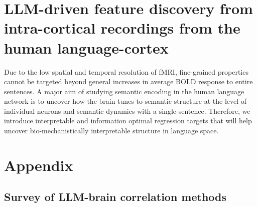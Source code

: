 \documentclass[11pt]{article}
\begin{document}
\section{LLM-driven feature discovery from intra-cortical recordings from the human language-cortex}

Due to the low spatial and temporal resolution of fMRI, fine-grained properties cannot be targeted beyond general increases in average BOLD response to entire sentences. A major aim of studying semantic encoding in the human language network is to uncover how the brain tunes to semantic structure at the level of individual neurons and semantic dynamics with a single-sentence. Therefore, we introduce interpretable and information optimal regression targets that will help uncover bio-mechanistically interpretable structure in language space.




\section{Appendix}

\subsection{Survey of LLM-brain correlation methods}
\end{document}
